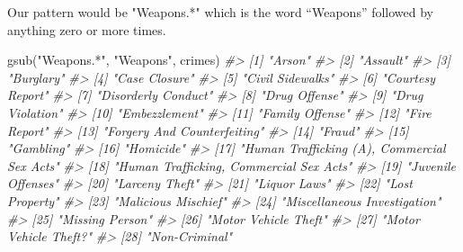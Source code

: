 \documentclass[
]{krantz}
\makeatletter
\newenvironment{Shaded}{\begin{snugshade}}{\end{snugshade}}
\newcommand{\CommentTok}[1]{\textcolor[rgb]{0.37,0.37,0.37}{\textit{#1}}}
\newcommand{\FunctionTok}[1]{\textcolor[rgb]{0,0,0}{#1}}
\newcommand{\NormalTok}[1]{#1}
\newcommand{\StringTok}[1]{\textcolor[rgb]{0.5,0.5,0.5}{#1}}
\newenvironment{kframe}{%
\medskip{}
\setlength{\fboxsep}{.8em}
 \def\at@end@of@kframe{}%
 \ifinner\ifhmode%
  \def\at@end@of@kframe{\end{minipage}}%
  \begin{minipage}{\columnwidth}%
 \fi\fi%
 \def\FrameCommand##1{\hskip\@totalleftmargin \hskip-\fboxsep
 \colorbox{shadecolor}{##1}\hskip-\fboxsep
     \hskip-\linewidth \hskip-\@totalleftmargin \hskip\columnwidth}%
 \MakeFramed {\advance\hsize-\width
   \@totalleftmargin\z@ \linewidth\hsize
   \@setminipage}}%
 {\par\unskip\endMakeFramed%
 \at@end@of@kframe}
\renewenvironment{Shaded}{\begin{kframe}}{\end{kframe}}
\makeatother
\begin{document}
Our pattern would be "Weapons.*" which is the word ``Weapons'' followed by anything zero or more times.

\begin{Shaded}
\begin{Highlighting}[]
\FunctionTok{gsub}\NormalTok{(}\StringTok{"Weapons.*"}\NormalTok{, }\StringTok{"Weapons"}\NormalTok{, crimes)}
\CommentTok{\#\textgreater{}  [1] "Arson"                                     }
\CommentTok{\#\textgreater{}  [2] "Assault"                                   }
\CommentTok{\#\textgreater{}  [3] "Burglary"                                  }
\CommentTok{\#\textgreater{}  [4] "Case Closure"                              }
\CommentTok{\#\textgreater{}  [5] "Civil Sidewalks"                           }
\CommentTok{\#\textgreater{}  [6] "Courtesy Report"                           }
\CommentTok{\#\textgreater{}  [7] "Disorderly Conduct"                        }
\CommentTok{\#\textgreater{}  [8] "Drug Offense"                              }
\CommentTok{\#\textgreater{}  [9] "Drug Violation"                            }
\CommentTok{\#\textgreater{} [10] "Embezzlement"                              }
\CommentTok{\#\textgreater{} [11] "Family Offense"                            }
\CommentTok{\#\textgreater{} [12] "Fire Report"                               }
\CommentTok{\#\textgreater{} [13] "Forgery And Counterfeiting"                }
\CommentTok{\#\textgreater{} [14] "Fraud"                                     }
\CommentTok{\#\textgreater{} [15] "Gambling"                                  }
\CommentTok{\#\textgreater{} [16] "Homicide"                                  }
\CommentTok{\#\textgreater{} [17] "Human Trafficking (A), Commercial Sex Acts"}
\CommentTok{\#\textgreater{} [18] "Human Trafficking, Commercial Sex Acts"    }
\CommentTok{\#\textgreater{} [19] "Juvenile Offenses"                         }
\CommentTok{\#\textgreater{} [20] "Larceny Theft"                             }
\CommentTok{\#\textgreater{} [21] "Liquor Laws"                               }
\CommentTok{\#\textgreater{} [22] "Lost Property"                             }
\CommentTok{\#\textgreater{} [23] "Malicious Mischief"                        }
\CommentTok{\#\textgreater{} [24] "Miscellaneous Investigation"               }
\CommentTok{\#\textgreater{} [25] "Missing Person"                            }
\CommentTok{\#\textgreater{} [26] "Motor Vehicle Theft"                       }
\CommentTok{\#\textgreater{} [27] "Motor Vehicle Theft?"                      }
\CommentTok{\#\textgreater{} [28] "Non{-}Criminal"                              }

\end{Highlighting}
\end{Shaded}
\end{document}

